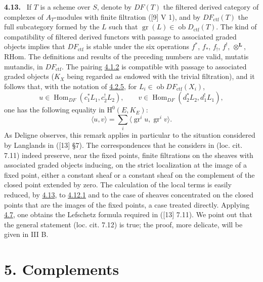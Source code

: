 \documentclass[11pt]{article}
\newenvironment{statement}[1]{\par\medskip\noindent\textbf{#1.}\ }{\par\medskip}
\renewcommand{\H}{\mathrm{H}}
\DeclareMathOperator{\Hom}{Hom}
\newcommand{\ob}{\operatorname{ob}}
\providecommand{\RHom}{\mathrm{RHom}}
\providecommand{\Dctf}{D_{\mathrm{ctf}}}
\providecommand{\ctf}{\mathrm{ctf}}
\providecommand{\gr}{\operatorname{gr}}
\providecommand{\Dctf}{D_{\mathrm{ctf}}}
\providecommand{\RHom}{\mathrm{RHom}}
\providecommand{\Hom}{\operatorname{Hom}}
\providecommand{\ob}{\operatorname{ob}}
\providecommand{\gr}{\operatorname{gr}}
\providecommand{\gr}{\operatorname{gr}}
\providecommand{\RHom}{\mathrm R\mathcal{H}om}
\providecommand{\RHom}{\mathrm{RHom}}
\providecommand{\Hom}{\operatorname{Hom}}
\begin{document}
\label{sga5:III:statement:4.13}\begin{statement}{4.13}
If $T$ is a scheme over $S$, denote by $DF(T)$ the filtered derived category of complexes of $A_T$-modules with finite filtration ([9] V 1), and by $DF_{\ctf}(T)$ the full subcategory formed by the $L$ such that $\gr(L)\in\ob\Dctf(T)$. The kind of compatibility of filtered derived functors with passage to associated graded objects implies that $DF_{\ctf}$ is stable under the six operations $f^*$, $f_*$, $f_!$, $f^!$, $\otimes^{\mathbf L}$, $\RHom$. The definitions and results of the preceding numbers are valid, mutatis mutandis, in $DF_{\ctf}$. The pairing \hyperref[sga5:III:equation:4.1.2]{4.1.2} is compatible with passage to associated graded objects ($K_X$ being regarded as endowed with the trivial filtration), and it follows that, with the notation of \hyperref[sga5:III:equation:4.2.5]{4.2.5}, for $L_i\in\ob DF_{\ctf}(X_i)$,
\[
u\in\Hom_{DF}(c_1^*L_1,c_2^!L_2),\qquad
v\in\Hom_{DF}(d_2^*L_2,d_1^!L_1),
\]
one has the following equality in $\H^0(E,K_E)$:
\begin{equation}
\tag{4.13.1}\label{sga5:III:equation:4.13.1}
\langle u,v\rangle=\sum_i\langle \gr^i u,\gr^i v\rangle.
\end{equation}
As Deligne observes, this remark applies in particular to the situation considered by Langlands in ([13] §7). The correspondences that he considers in (loc. cit. 7.11) indeed preserve, near the fixed points, finite filtrations on the sheaves with associated graded objects inducing, on the strict localization at the image of a fixed point, either a constant sheaf or a constant sheaf on the complement of the closed point extended by zero. The calculation of the local terms is easily reduced, by \hyperref[sga5:III:statement:4.13]{4.13}, to \hyperref[sga5:III:equation:4.12.1]{4.12.1} and to the case of sheaves concentrated on the closed points that are the images of the fixed points, a case treated directly. Applying \hyperref[sga5:III:corollary:4.7]{4.7}, one obtains the Lefschetz formula required in ([13] 7.11). We point out that the general statement (loc. cit. 7.12) is true; the proof, more delicate, will be given in III B.
\end{statement}



\section*{5. Complements}\label{sga5:III:section:5}
\end{document}
